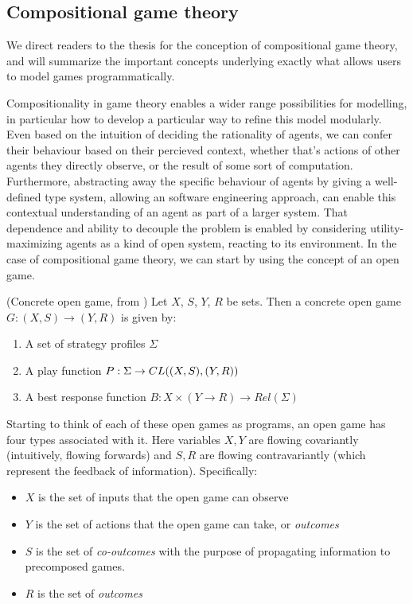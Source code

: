 \subsection{Compositional game theory}
We direct readers to the thesis \cite{HedgesThesis} for the conception of compositional game theory, and will summarize the important concepts underlying exactly what allows users to model games programmatically.


Compositionality in game theory enables a wider range possibilities for modelling, in particular how to develop a particular way to refine this model modularly. Even based on the intuition of deciding the rationality of agents, we can confer their behaviour based on their percieved context, whether that's actions of other agents they directly observe, or the result of some sort of computation. Furthermore, abstracting away the specific behaviour of agents by giving a well-defined type system, allowing an software engineering approach, can enable this contextual understanding of an agent as part of a larger system. That dependence and ability to decouple the problem is enabled by considering utility-maximizing agents as a kind of open system, reacting to its environment. In the case of compositional game theory, we can start by using the concept of an open game. 

\begin{Definition} (Concrete open game, from \cite{BayesianOpenGames}) Let $X$, $S$, $Y$, $R$ be sets. Then a concrete open game $G: (X,S) \rightarrow (Y,R)$ is given by: 
	\begin{enumerate}
		\item A set of strategy profiles $\Sigma$
		\item A play function $P : \Sigma \rightarrow \boldmath{CL}((X,S), (Y,R))$
		\item A best response function $B: X \times (Y \rightarrow R) \rightarrow Rel(\Sigma)$
	\end{enumerate}

\end{Definition}




Starting to think of each of these open games as programs, an open game has four types associated with it. Here variables $X, Y$ are flowing covariantly (intuitively, flowing forwards) and $S, R$ are flowing contravariantly (which represent the feedback of information). Specifically: 
\begin{itemize}
	\item $X$ is the set of inputs that the open game can observe 
	\item $Y$ is the set of actions that the open game can take, or \textit{outcomes}
	\item $S$ is the set of \textit{co-outcomes} with the purpose of propagating information to precomposed games. 
	\item $R$ is the set of \textit{outcomes}
\end{itemize}

